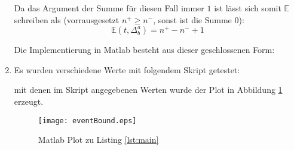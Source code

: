 \documentclass[DIN, pagenumber=false, fontsize=11pt, parskip=half]{scrartcl}
\begin{document}
\begin{enumerate}[label=\alph*)]
            Da das Argument der Summe für diesen Fall immer $1$ ist lässt sich somit
            $\mathbb{E}$ schreiben als (vorrausgesetzt $n^+ \geq n^-$, sonst
            ist die Summe $0$):
            \begin{equation}
                \mathbb{E}(t, \Delta^a_b) = n^+ - n^- + 1
            \end{equation}

            Die Implementierung in Matlab besteht aus dieser geschlossenen Form:
            
        \item
            Es wurden verschiedene Werte mit folgendem Skript getestet:
            

            mit denen im Skript angegebenen Werten wurde der Plot in Abbildung
            \ref{fig:eventBound} erzeugt.

            \begin{figure}[h]
                \centering
                \texttt{[image: eventBound.eps]}
                \caption{Matlab Plot zu Listing \ref{lst:main}}
                \label{fig:eventBound}
            \end{figure}
    \end{enumerate}
\end{document}

